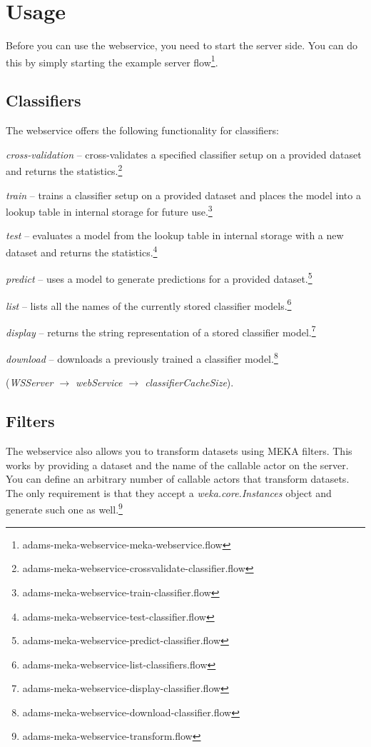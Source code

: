 \documentclass[a4paper]{book}
\begin{document}
\clearpage
\chapter{Usage}
Before you can use the webservice, you need to start the server side. You can
do this by simply starting the example server 
flow\footnote{adams-meka-webservice-meka-webservice.flow}.

\section{Classifiers}
The webservice offers the following functionality for classifiers:
\begin{tight_itemize}
	\item \textit{cross-validation} -- cross-validates a specified classifier
	setup on a provided dataset and returns the statistics.\footnote{adams-meka-webservice-crossvalidate-classifier.flow}
	\item \textit{train} -- trains a classifier setup on a provided dataset 
	and places the model into a lookup table in internal storage for future
	use.\footnote{adams-meka-webservice-train-classifier.flow}
	\item \textit{test} -- evaluates a model from the lookup table in internal
	storage with a new dataset and returns the
	statistics.\footnote{adams-meka-webservice-test-classifier.flow}
	\item \textit{predict} -- uses a  model to generate predictions for
	a provided dataset.\footnote{adams-meka-webservice-predict-classifier.flow}
	\item \textit{list} -- lists all the names of the currently stored classifier
	models.\footnote{adams-meka-webservice-list-classifiers.flow}
	\item \textit{display} -- returns the string representation of a stored
	classifier model.\footnote{adams-meka-webservice-display-classifier.flow}
	\item \textit{download} -- downloads a previously trained a classifier 
	model.\footnote{adams-meka-webservice-download-classifier.flow}
\end{tight_itemize}
(\textit{WSServer $\rightarrow$ webService $\rightarrow$ classifierCacheSize}).

\section{Filters}
The webservice also allows you to transform datasets using MEKA filters. This
works by providing a dataset and the name of the callable actor on the server.
You can define an arbitrary number of callable actors that transform datasets.
The only requirement is that they accept a \textit{weka.core.Instances} object
and generate such one as well.\footnote{adams-meka-webservice-transform.flow}
\end{document}
